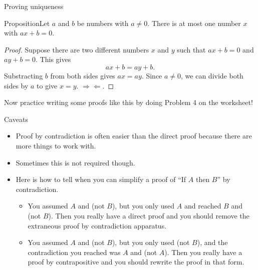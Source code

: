 \documentclass{beamer}
\def\bl[#1]#2{\begin{block}{#1}#2\end{block}}
\def\itemb{\begin{itemize}}
\def\iteme{\end{itemize}}
\begin{document}
\begin{frame}{Proving uniqueness}
\bl[Proposition]{Let $a$ and $b$ be numbers with $a\neq 0$. There is at most one number $x$ with $ax+b=0$.}

\begin{proof}
Suppose there are two different numbers $x$ and $y$ such that $ax+b=0$ and $ay+b=0$. This gives
\[
ax+b=ay+b.
\]
Substracting $b$ from both sides gives $ax=ay$. Since $a\neq 0$, we can divide both sides by $a$ to give $x=y$. $\Rightarrow\Leftarrow$.
\end{proof}
\center Now practice writing some proofs like this by doing Problem 4 on the worksheet!
\end{frame}

\begin{frame}{Caveats}
\itemb
\item Proof by contradiction is often easier than the direct proof because there are more things to work with.
\item Sometimes this is not required though.
\item Here is how to tell when you can simplify a proof of ``If $A$ then $B$'' by contradiction.

\itemb
\item You assumed $A$ and (not $B$), but you only used $A$ and reached $B$ and (not $B$). Then you really have a direct proof and you should remove the extraneous proof by contradiction apparatus.
\item You assumed $A$ and (not $B$), but you only used (not $B$), and the contradiction you reached was $A$ and (not $A$). Then you really have a proof by contrapositive and you should rewrite the proof in that form.
\iteme
\iteme
\end{frame}
\end{document}
